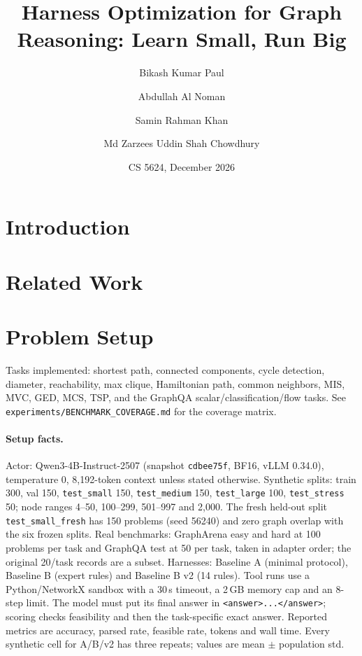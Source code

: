 \documentclass[11pt]{article}
\title{Harness Optimization for Graph Reasoning: Learn Small, Run Big}
\author{Bikash Kumar Paul \and Abdullah Al Noman \and Samin Rahman Khan \and Md Zarzees Uddin Shah Chowdhury}
\date{CS 5624, December 2026}
\begin{document}
\maketitle


\begin{abstract}
\end{abstract}

\section{Introduction}

\section{Related Work}

\section{Problem Setup}
Tasks implemented: shortest path, connected components, cycle detection,
diameter, reachability, max clique, Hamiltonian path, common neighbors, MIS,
MVC, GED, MCS, TSP, and the GraphQA scalar/classification/flow tasks.
See \texttt{experiments/BENCHMARK\_COVERAGE.md} for the coverage matrix.

\paragraph{Setup facts.}
Actor: Qwen3-4B-Instruct-2507 (snapshot \texttt{cdbee75f}, BF16, vLLM 0.34.0),
temperature 0, 8{,}192-token context unless stated otherwise. Synthetic
splits: train 300, val 150, \texttt{test\_small} 150, \texttt{test\_medium}
150, \texttt{test\_large} 100, \texttt{test\_stress} 50; node ranges 4--50,
100--299, 501--997 and 2{,}000. The fresh held-out split
\texttt{test\_small\_fresh} has 150 problems (seed 56240) and zero graph
overlap with the six frozen splits. Real benchmarks: GraphArena easy and hard
at 100 problems per task and GraphQA test at 50 per task, taken in adapter
order; the original 20/task records are a subset. Harnesses: Baseline A
(minimal protocol), Baseline B (expert rules) and Baseline B v2 (14 rules).
Tool runs use a Python/NetworkX sandbox with a 30\,s timeout, a 2\,GB memory
cap and an 8-step limit. The model must put its final answer in
\texttt{<answer>...</answer>}; scoring checks feasibility and then the
task-specific exact answer. Reported metrics are accuracy, parsed rate,
feasible rate, tokens and wall time. Every synthetic cell for A/B/v2 has three
repeats; values are mean $\pm$ population std.
\end{document}
